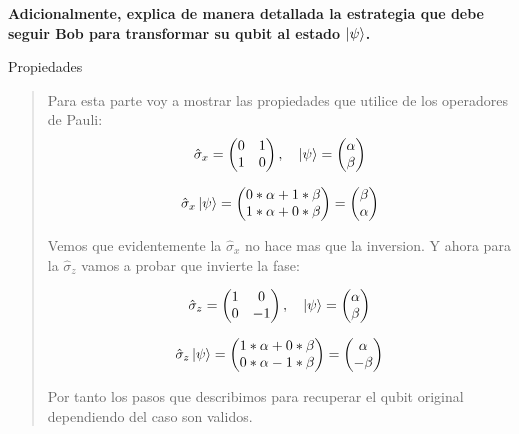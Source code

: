 \textbf{Adicionalmente, explica de manera detallada la estrategia que debe seguir Bob para
transformar su qubit al estado $\ket{\psi}$.}\vspace{.2cm}

\textcolor{bibi}{Propiedades}
\begin{quote}
    Para esta parte voy a mostrar las propiedades que utilice de los operadores de Pauli:
    \begin{align*}
        \hat{\sigma}_x =
        \begin{pmatrix}
            0 & 1\\
            1 & 0
        \end{pmatrix}
        , \ \ \ \ket{\psi} = 
        \begin{pmatrix}
            \alpha\\
            \beta
        \end{pmatrix}
    \end{align*}

    \begin{align*}
        \hat{\sigma}_x\ket{\psi} = 
        \begin{pmatrix}
            0*\alpha +1*\beta\\
            1*\alpha +0*\beta
        \end{pmatrix}
        = 
        \begin{pmatrix}
            \beta\\
            \alpha
        \end{pmatrix}
    \end{align*}

    Vemos que evidentemente la $\hat{\sigma}_x$ no hace mas que la inversion. Y ahora para la
    $\hat{\sigma}_z$ vamos a probar que invierte la fase:

    \begin{align*}
        \hat{\sigma}_z =
        \begin{pmatrix}
            1 & 0\\
            0 & -1
        \end{pmatrix}
        , \ \ \ \ket{\psi} = 
        \begin{pmatrix}
            \alpha\\
            \beta
        \end{pmatrix}
    \end{align*}

     \begin{align*}
        \hat{\sigma}_z\ket{\psi} = 
        \begin{pmatrix}
            1*\alpha +0*\beta\\
            0*\alpha -1*\beta
        \end{pmatrix}
        = 
        \begin{pmatrix}
            \alpha\\
            -\beta
        \end{pmatrix}
    \end{align*}

    Por tanto los pasos que describimos para recuperar el qubit original dependiendo del caso son
    validos. 
\end{quote}
